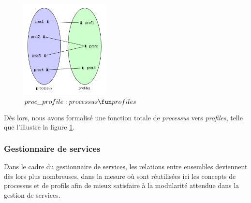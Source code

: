 \documentclass[french, titlepage, 10pt, a4paper]{article}
\begin{document}
\begin{figure}[htb]
  \centering
  \includegraphics[width=0.4\textwidth]{proc_profile.png}
  \caption{$proc\_profile: processus \fun profiles$}
  \label{fig:proc_profile}
\end{figure}

Dès lors, nous avons formalisé une fonction totale de \emph{processus} vers
\emph{profiles}, telle que l'illustre la figure \ref{fig:proc_profile}.

\subsubsection{Gestionnaire de services}

Dans le cadre du gestionnaire de services, les relations entre ensembles
deviennent dès lors plus nombreuses, dans la mesure où sont réutilisées ici les
concepts de processus et de profils afin de mieux satisfaire à la modularité
attendue dans la gestion de services.
\end{document}
